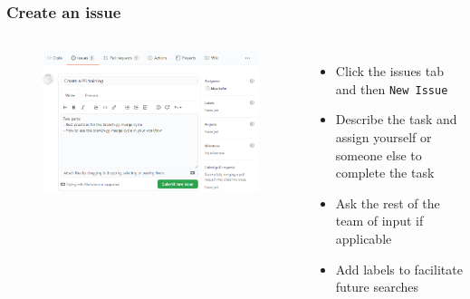 \documentclass[aspectratio=169]{beamer} %
\begin{document}
\begin{frame}
	\frametitle{Create an issue}
	\begin{columns}[c]

		\vspace{-.5cm}
		\begin{figure}
			\centering
			\includegraphics[width=\textwidth]{./img/create-issue-1.png}
		\end{figure}


		\begin{itemize}
			\setlength\itemsep{.5em}
			\item Click the issues tab and then \texttt{New Issue}
			\item Describe the task and assign yourself or someone else to complete the task
			\item Ask the rest of the team of input if applicable
			\item Add labels to facilitate future searches

		\end{itemize}

	\end{columns}
\end{frame}
\end{document}
